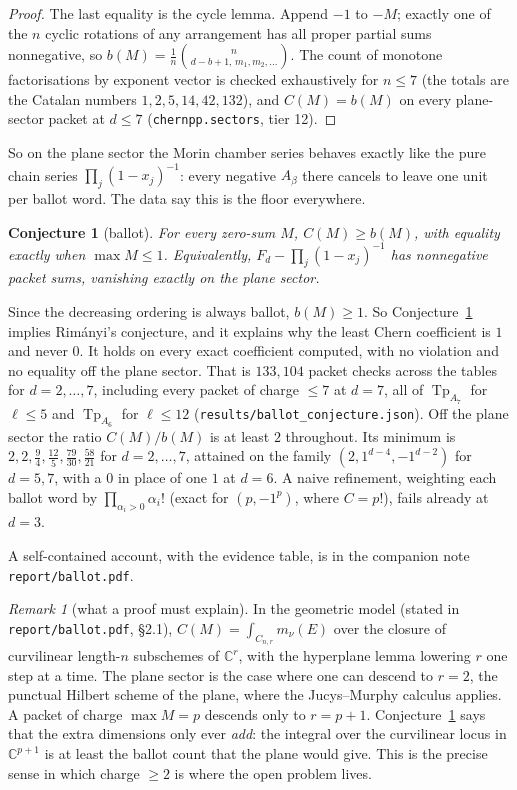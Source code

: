 \documentclass[11pt,a4paper]{article}
\DeclareMathOperator{\Tp}{Tp}
\theoremstyle{plain}
\newtheorem{conjecture}[theorem]{Conjecture}
\theoremstyle{definition}
\theoremstyle{remark}
\newtheorem{remark}[theorem]{Remark}
\begin{document}
\begin{proof}
The last equality is the cycle lemma. Append $-1$ to $-M$; exactly one of the $n$ cyclic rotations
of any arrangement has all proper partial sums nonnegative, so $b(M) = \frac1n \binom{n}{d-b+1,\,
m_1, m_2, \dots}$. The count of monotone factorisations by exponent vector is checked exhaustively
for $n \le 7$ (the totals are the Catalan numbers $1, 2, 5, 14, 42, 132$), and $C(M) = b(M)$ on
every plane-sector packet at $d \le 7$ (\texttt{chernpp.sectors}, tier 12).
\end{proof}

So on the plane sector the Morin chamber series behaves exactly like the pure chain series
$\prod_j (1-x_j)^{-1}$: every negative $A_\beta$ there cancels to leave one unit per ballot word. The
data say this is the floor everywhere.

\begin{conjecture}[ballot]\label{conj:ballot}
For every zero-sum $M$, $C(M) \ge b(M)$, with equality exactly when $\max M \le 1$. Equivalently,
$F_d - \prod_j (1-x_j)^{-1}$ has nonnegative packet sums, vanishing exactly on the plane sector.
\end{conjecture}

Since the decreasing ordering is always ballot, $b(M) \ge 1$. So Conjecture~\ref{conj:ballot}
implies Rim\'anyi's conjecture, and it explains why the least Chern coefficient is $1$ and never
$0$. It holds on every exact coefficient computed, with no violation and no equality off the
plane sector. That is $133{,}104$ packet checks across the tables for $d = 2, \dots, 7$, including every packet of charge $\le 7$ at $d = 7$, all of $\Tp_{A_7}$ for
$\ell \le 5$ and $\Tp_{A_6}$ for $\ell \le 12$ (\texttt{results/ballot\_conjecture.json}). Off the
plane sector the ratio $C(M)/b(M)$ is at least $2$ throughout. Its minimum is $2, 2, \tfrac94,
\tfrac{12}{5}, \tfrac{79}{30}, \tfrac{58}{21}$ for $d = 2, \dots, 7$, attained on the family
$(2, 1^{d-4}, -1^{d-2})$ for $d = 5, 7$, with a $0$ in place of one $1$ at $d = 6$. A naive
refinement, weighting each ballot word by $\prod_{\alpha_i > 0} \alpha_i!$ (exact for $(p, -1^p)$,
where $C = p!$), fails already at $d = 3$.

A self-contained account, with the evidence table, is in the companion note \texttt{report/ballot.pdf}.

\begin{remark}[what a proof must explain]
In the geometric model (stated in \texttt{report/ballot.pdf}, \S2.1), $C(M) = \int_{C_{n,r}} m_\nu(E)$ over the closure of
curvilinear length-$n$ subschemes of $\mathbb{C}^r$, with the hyperplane lemma lowering $r$ one step
at a time. The plane sector is the case where one can descend to $r = 2$, the punctual Hilbert
scheme of the plane, where the Jucys--Murphy calculus applies. A packet of charge $\max M = p$
descends only to $r = p+1$. Conjecture~\ref{conj:ballot} says that the extra dimensions only ever
\emph{add}: the integral over the curvilinear locus in $\mathbb{C}^{p+1}$ is at least the ballot count
that the plane would give. This is the precise sense in which charge $\ge 2$ is where the open
problem lives.
\end{remark}
\end{document}
